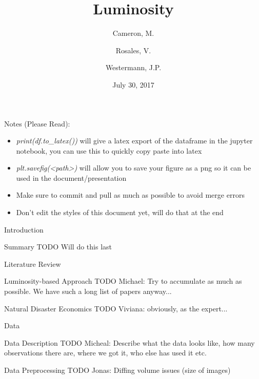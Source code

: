\documentclass[12pt,fleqn,leqno,letterpaper]{article}
\title{Luminosity}
\author{
  Cameron, M.
  \and
  Rosales, V.
  \and
  Westermann, J.P.
}
\date{July 30, 2017}
\begin{document}
\maketitle

\newpage
\tableofcontents
\listoffigures
\listoftables

\newpage

Notes (Please Read):
\begin{itemize}
  \item \textit{print(df.to\_latex())} will give a latex export of the dataframe in the jupyter notebook, you can use this to quickly copy paste into latex
  \item \textit{plt.savefig(<path>)} will allow you to save your figure as a png so it can be used in the document/presentation
  \item Make sure to commit and pull as much as possible to avoid merge errors
  \item Don't edit the styles of this document yet, will do that at the end
\end{itemize}

\begin{section}{Introduction}
  \begin{subsection}{Summary}
    TODO Will do this last
  \end{subsection}
  \begin{subsection}{Literature Review}
    \begin{subsubsection}{Luminosity-based Approach}
      TODO Michael: Try to accumulate as much as possible. We have such a long list of papers anyway...
    \end{subsubsection}
    \begin{subsubsection}{Natural Disaster Economics}
      TODO Viviana: obviously, as the expert...
    \end{subsubsection}
  \end{subsection}
\end{section}

\begin{section}{Data}
  \begin{subsection}{Data Description}
    TODO Micheal: Describe what the data looks like, how many observations there are, where we got it, who else has used it etc.
  \end{subsection}
  \begin{subsection}{Data Preprocessing}
    TODO Jonas: Diffing volume issues (size of images)
  \end{subsection}
\end{section}
\end{document}
